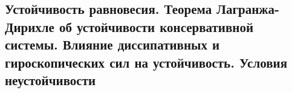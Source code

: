 

\subsection{Устойчивость равновесия. Теорема Лагранжа-Дирихле об устойчивости консервативной системы. Влияние диссипативных и гироскопических сил на устойчивость. Условия неустойчивости}



